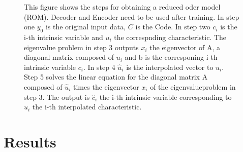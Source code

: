 \documentclass[12pt, a4paper]{article}
\begin{document}
\begin{figure}
	\centering
	
	\caption{This figure shows the steps for obtaining a reduced oder model (ROM). Decoder and Encoder need to be used after training. In step one $y_0$ is the original input data, $C$ is the Code. In step two $c_i$ is the i-th intrinsic variable and $u_i$ the correspnding characteristic. The eigenvalue problem in step 3 outputs $x_i$ the eigenvector of A, a diagonal matrix composed of $u_i$ and b is the corresponing i-th intrinsic variable $c_i$. In step 4 $\hat{u}_i$ is the interpolated vector to $u_i$. Step 5 solves the linear equation for the diagonal matrix A composed of $\hat{u}_i$ times the eigenvector $x_i$ of the eigenvalueproblem in step 3. The output is $\hat{c}_i$ the i-th intrinsic variable corresponding to $\hat{u}_i$ the i-th interpolated characteristic.}
	\label{Fig. Flowchart}
\end{figure}
\section{Results}\label{Results}
\end{document}
